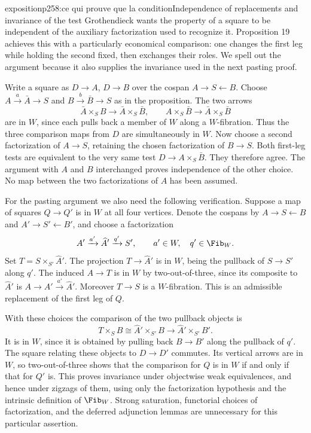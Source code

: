 \begin{dcomment}{exposition}{p258:ce qui prouve que la condition}{Independence of replacements and invariance of the test}
Grothendieck wants the property of a square to be independent of the auxiliary factorization used to recognize it. Proposition 19 achieves this with a particularly economical comparison: one changes the first leg while holding the second fixed, then exchanges their roles. We spell out the argument because it also supplies the invariance used in the next pasting proof.

Write a square as $D\to A$, $D\to B$ over the cospan $A\to S\leftarrow B$. Choose $A\xrightarrow{a}\bar A\to S$ and $B\xrightarrow{b}\bar B\to S$ as in the proposition. The two arrows
\[
 \bar A\times_S B\longrightarrow\bar A\times_S\bar B,
 \qquad
 A\times_S\bar B\longrightarrow\bar A\times_S\bar B
\]
are in $W$, since each pulls back a member of $W$ along a $W$-fibration. Thus the three comparison maps from $D$ are simultaneously in $W$. Now choose a second factorization of $A\to S$, retaining the chosen factorization of $B\to S$. Both first-leg tests are equivalent to the very same test $D\to A\times_S\bar B$. They therefore agree. The argument with $A$ and $B$ interchanged proves independence of the other choice. No map between the two factorizations of $A$ has been assumed.

For the pasting argument we also need the following verification. Suppose a map of squares $Q\to Q'$ is in $W$ at all four vertices. Denote the cospans by $A\to S\leftarrow B$ and $A'\to S'\leftarrow B'$, and choose a factorization
\[
 A'\xrightarrow{a'}\widehat A'\xrightarrow{q'}S',
 \qquad a'\in W,\quad q'\in\Fib_W.
\]
Set $T=S\times_{S'}\widehat A'$. The projection $T\to\widehat A'$ is in $W$, being the pullback of $S\to S'$ along $q'$. The induced $A\to T$ is in $W$ by two-out-of-three, since its composite to $\widehat A'$ is $A\to A'\xrightarrow{a'}\widehat A'$. Moreover $T\to S$ is a $W$-fibration. This is an admissible replacement of the first leg of $Q$.

With these choices the comparison of the two pullback objects is
\[
 T\times_S B\cong\widehat A'\times_{S'}B
 \longrightarrow\widehat A'\times_{S'}B'.
\]
It is in $W$, since it is obtained by pulling back $B\to B'$ along the pullback of $q'$. The square relating these objects to $D\to D'$ commutes. Its vertical arrows are in $W$, so two-out-of-three shows that the comparison for $Q$ is in $W$ if and only if that for $Q'$ is. This proves invariance under objectwise weak equivalences, and hence under zigzags of them, using only the factorization hypothesis and the intrinsic definition of $\Fib_W$. Strong saturation, functorial choices of factorization, and the deferred adjunction lemmas are unnecessary for this particular assertion.
\end{dcomment}

